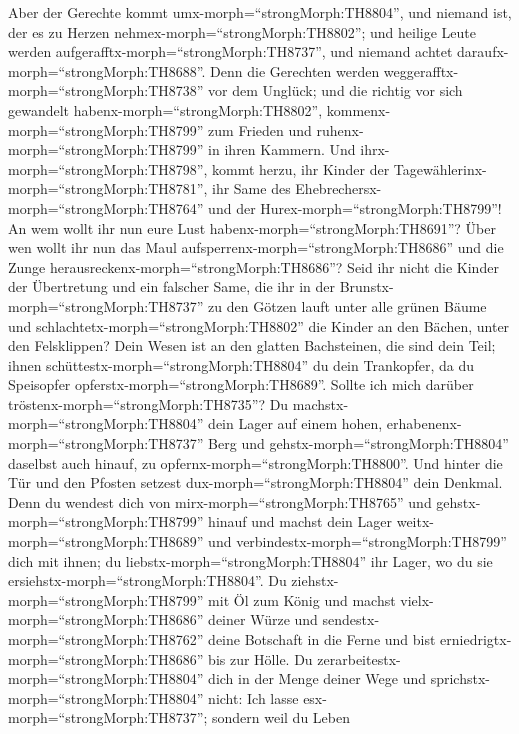 Aber der Gerechte kommt umx-morph=``strongMorph:TH8804'',
und niemand ist, der es zu Herzen nehmex-morph=``strongMorph:TH8802'';
und heilige Leute werden aufgerafftx-morph=``strongMorph:TH8737'', und
niemand achtet daraufx-morph=``strongMorph:TH8688''. Denn die Gerechten
werden weggerafftx-morph=``strongMorph:TH8738'' vor dem Unglück;
 und die richtig vor sich gewandelt
habenx-morph=``strongMorph:TH8802'',
kommenx-morph=``strongMorph:TH8799'' zum Frieden und
ruhenx-morph=``strongMorph:TH8799'' in ihren Kammern.  Und
ihrx-morph=``strongMorph:TH8798'', kommt herzu, ihr Kinder der
Tagewählerinx-morph=``strongMorph:TH8781'', ihr Same des
Ehebrechersx-morph=``strongMorph:TH8764'' und der
Hurex-morph=``strongMorph:TH8799''!  An wem wollt ihr nun
eure Lust habenx-morph=``strongMorph:TH8691''? Über wen wollt ihr nun
das Maul aufsperrenx-morph=``strongMorph:TH8686'' und die Zunge
herausreckenx-morph=``strongMorph:TH8686''? Seid ihr nicht die Kinder
der Übertretung und ein falscher Same,  die ihr in der
Brunstx-morph=``strongMorph:TH8737'' zu den Götzen lauft unter alle
grünen Bäume und schlachtetx-morph=``strongMorph:TH8802'' die Kinder an
den Bächen, unter den Felsklippen?  Dein Wesen ist an den
glatten Bachsteinen, die sind dein Teil; ihnen
schüttestx-morph=``strongMorph:TH8804'' du dein Trankopfer, da du
Speisopfer opferstx-morph=``strongMorph:TH8689''. Sollte ich mich
darüber tröstenx-morph=``strongMorph:TH8735''?  Du
machstx-morph=``strongMorph:TH8804'' dein Lager auf einem hohen,
erhabenenx-morph=``strongMorph:TH8737'' Berg und
gehstx-morph=``strongMorph:TH8804'' daselbst auch hinauf, zu
opfernx-morph=``strongMorph:TH8800''.  Und hinter die Tür
und den Pfosten setzest dux-morph=``strongMorph:TH8804'' dein Denkmal.
Denn du wendest dich von mirx-morph=``strongMorph:TH8765'' und
gehstx-morph=``strongMorph:TH8799'' hinauf und machst dein Lager
weitx-morph=``strongMorph:TH8689'' und
verbindestx-morph=``strongMorph:TH8799'' dich mit ihnen; du
liebstx-morph=``strongMorph:TH8804'' ihr Lager, wo du sie
ersiehstx-morph=``strongMorph:TH8804''.  Du
ziehstx-morph=``strongMorph:TH8799'' mit Öl zum König und machst
vielx-morph=``strongMorph:TH8686'' deiner Würze und
sendestx-morph=``strongMorph:TH8762'' deine Botschaft in die Ferne und
bist erniedrigtx-morph=``strongMorph:TH8686'' bis zur Hölle.
 Du zerarbeitestx-morph=``strongMorph:TH8804'' dich in der
Menge deiner Wege und sprichstx-morph=``strongMorph:TH8804'' nicht: Ich
lasse esx-morph=``strongMorph:TH8737''; sondern weil du Leben

